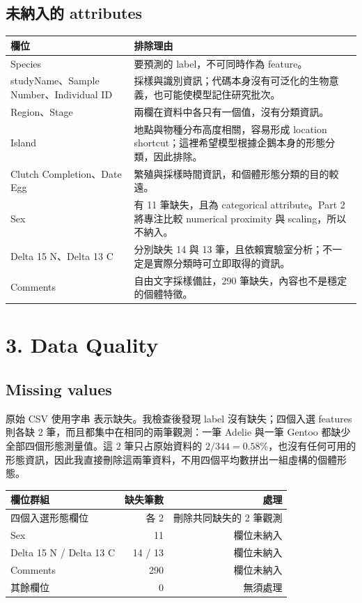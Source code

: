 \clearpage
\pagestyle{fancy}
\subsection*{未納入的 attributes}

\begin{table}[H]
\centering
\small
\begin{tabularx}{\linewidth}{L{4.2cm}Y}
\toprule
\textbf{欄位} & \textbf{排除理由} \\
\midrule
Species & 要預測的 label，不可同時作為 feature。 \\
studyName、Sample Number、Individual ID & 採樣與識別資訊；代碼本身沒有可泛化的生物意義，也可能使模型記住研究批次。 \\
Region、Stage & 兩欄在資料中各只有一個值，沒有分類資訊。 \\
Island & 地點與物種分布高度相關，容易形成 location shortcut；這裡希望模型根據企鵝本身的形態分類，因此排除。 \\
Clutch Completion、Date Egg & 繁殖與採樣時間資訊，和個體形態分類的目的較遠。 \\
Sex & 有 11 筆缺失，且為 categorical attribute。Part 2 將專注比較 numerical proximity 與 scaling，所以不納入。 \\
Delta 15 N、Delta 13 C & 分別缺失 14 與 13 筆，且依賴實驗室分析；不一定是實際分類時可立即取得的資訊。 \\
Comments & 自由文字採樣備註，290 筆缺失，內容也不是穩定的個體特徵。 \\
\bottomrule
\end{tabularx}
\end{table}

\section*{3. Data Quality}
\sectionrule

\subsection*{Missing values}

原始 CSV 使用字串  表示缺失。我檢查後發現 label 沒有缺失；四個入選 features 則各缺 2 筆，而且都集中在相同的兩筆觀測：一筆 Adelie 與一筆 Gentoo 都缺少全部四個形態測量值。這 2 筆只占原始資料的 $2/344=0.58\%$，也沒有任何可用的形態資訊，因此我直接刪除這兩筆資料，不用四個平均數拼出一組虛構的個體形態。

\begin{table}[H]
\centering
\small
\begin{tabular}{lrr}
\toprule
\textbf{欄位群組} & \textbf{缺失筆數} & \textbf{處理} \\
\midrule
四個入選形態欄位 & 各 2 & 刪除共同缺失的 2 筆觀測 \\
Sex & 11 & 欄位未納入 \\
Delta 15 N / Delta 13 C & 14 / 13 & 欄位未納入 \\
Comments & 290 & 欄位未納入 \\
其餘欄位 & 0 & 無須處理 \\
\bottomrule
\end{tabular}
\end{table}

